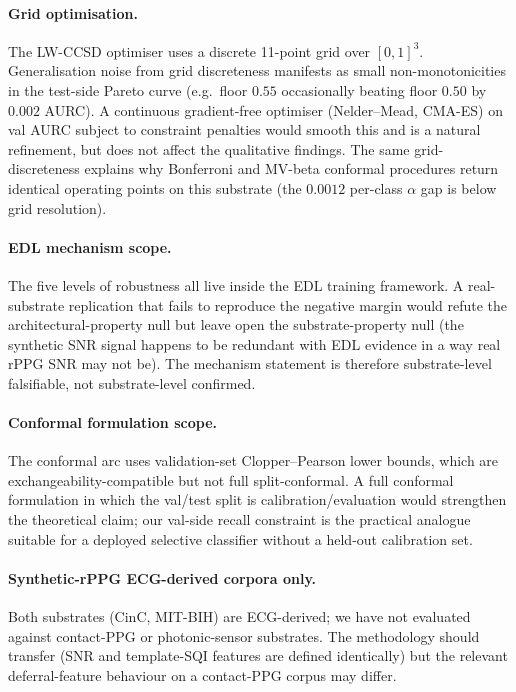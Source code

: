 \documentclass[journal]{IEEEtran}
\begin{document}
\paragraph{Grid optimisation.} The LW-CCSD optimiser uses a discrete 11-point grid over $[0,1]^3$. Generalisation noise from grid discreteness manifests as small non-monotonicities in the test-side Pareto curve (e.g.\ floor $0.55$ occasionally beating floor $0.50$ by $0.002$ AURC). A continuous gradient-free optimiser (Nelder--Mead, CMA-ES) on val AURC subject to constraint penalties would smooth this and is a natural refinement, but does not affect the qualitative findings. The same grid-discreteness explains why Bonferroni and MV-beta conformal procedures return identical operating points on this substrate (the $0.0012$ per-class $\alpha$ gap is below grid resolution).

\paragraph{EDL mechanism scope.} The five levels of robustness all live inside the EDL training framework. A real-substrate replication that fails to reproduce the negative margin would refute the architectural-property null but leave open the substrate-property null (the synthetic SNR signal happens to be redundant with EDL evidence in a way real rPPG SNR may not be). The mechanism statement is therefore substrate-level falsifiable, not substrate-level confirmed.

\paragraph{Conformal formulation scope.} The conformal arc uses validation-set Clopper--Pearson lower bounds, which are exchangeability-compatible but not full split-conformal. A full conformal formulation in which the val/test split is calibration/evaluation would strengthen the theoretical claim; our val-side recall constraint is the practical analogue suitable for a deployed selective classifier without a held-out calibration set.

\paragraph{Synthetic-rPPG ECG-derived corpora only.} Both substrates (CinC, MIT-BIH) are ECG-derived; we have not evaluated against contact-PPG or photonic-sensor substrates. The methodology should transfer (SNR and template-SQI features are defined identically) but the relevant deferral-feature behaviour on a contact-PPG corpus may differ.
\end{document}
